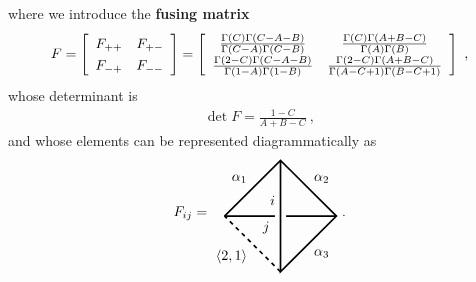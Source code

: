 \documentclass[12pt, a4paper, notitlepage, twoside]{report}
\numberwithin{equation}{section}
\theoremstyle{break}
\begin{document}
where we introduce the \textbf{fusing matrix} 
\begin{align}
 F = \left[\begin{array}{cc} F_{++} & F_{+-} \\ F_{-+} & F_{--} \end{array}\right] 
= \left[\renewcommand{\arraystretch}{1.3}\begin{array}{cc}
         \frac{\Gamma(C)\Gamma(C-A-B)}{\Gamma(C-A)\Gamma(C-B)} & \frac{\Gamma(C)\Gamma(A+B-C)}{\Gamma(A)\Gamma(B)} 
       \\   \frac{\Gamma(2-C)\Gamma(C-A-B)}{\Gamma(1-A)\Gamma(1-B)} & \frac{\Gamma(2-C)\Gamma(A+B-C)}{\Gamma(A-C+1)\Gamma(B-C+1)}
        \end{array}\right]\ ,
\label{fmd}
\end{align}
whose determinant is 
\begin{align}
 \det F = \frac{1-C}{A+B-C}\ ,
\label{detf}
\end{align}
and whose elements can be represented diagrammatically as
\begin{align}
F_{ij} =
\begin{tikzpicture}[baseline=(current  bounding  box.center), very thick, scale = .7]
\draw (-2, 0) -- node [above left] {$\alpha_1$} (0, 2) -- node [above right] {$\alpha_2$} (2, 0) -- node [below right] {$\alpha_3$} (0, -2) -- (0, 2);
\draw[dashed] (0, -2) -- node [below left] {$\langle 2,1 \rangle$} (-2, 0);
\draw (-2, 0) -- (-.2, 0) node [below left] {$j$}; \draw (.2, 0) -- (2, 0);
\node [above left] at (0, .2) {$i$};
\end{tikzpicture}
\ .
\label{fpic}
\end{align}
\end{document}
